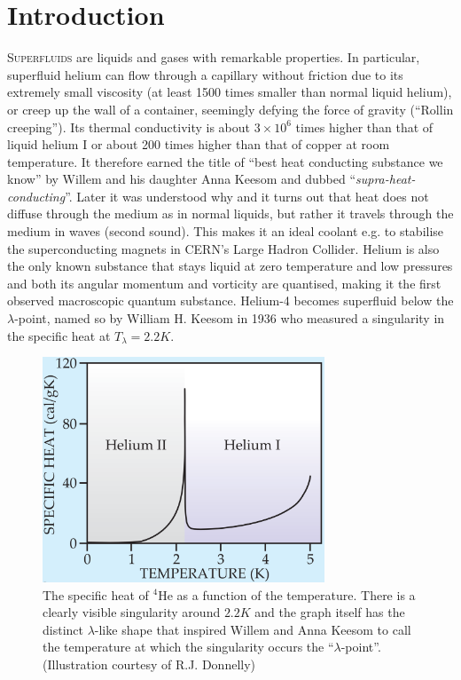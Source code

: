 \chapter{Introduction}
	\lettrine[lines=4]{\color{activeColor}S}{uperfluids} are liquids and gases with remarkable properties. In particular, superfluid helium can flow through a capillary without friction due to its extremely small viscosity (at least 1500 times smaller than normal liquid helium\citep{Kapitza1938}), or creep up the wall of a container, seemingly defying the force of gravity\citep{Rollin1939} (``Rollin creeping''). Its thermal conductivity is about $3\times10^6$ times higher than that of liquid helium I or about 200 times higher than that of copper at room temperature\citep{Keesom1936}. It therefore earned the title of ``best heat conducting substance we know'' by Willem and his daughter Anna Keesom and dubbed ``\emph{supra-heat-conducting}''\citep{Keesom1936}. Later it was understood why\citep{Tisza1938-1,Tisza1938-2,Tisza1940-1,Tisza1940-2} and it turns out that heat does not diffuse through the medium as in normal liquids, but rather it travels through the medium in waves (second sound). This makes it an ideal coolant e.g. to stabilise the superconducting magnets in CERN's Large Hadron Collider\citep{Lebrun1994}. Helium is also the only known substance that stays liquid at zero temperature and low pressures and both its angular momentum and vorticity are quantised, making it the first observed macroscopic quantum substance. Helium-4 becomes superfluid below the $\lambda$-point, named so by William H. Keesom in 1936 who measured a singularity in the specific heat at $T_\lambda=2.2\unit{K}$\citep{Keesom1936}.
	
	\begin{figure}[t]
		\begin{center}
			\includegraphics[width=0.75\textwidth]{specific-heat}
		\end{center}
		\caption{The specific heat of $^4$He as a function of the temperature. There is a clearly visible singularity around $2.2\unit{K}$ and the graph itself has the distinct $\lambda$-like shape that inspired\citep{Keesom1932} Willem and Anna Keesom to call the temperature at which the singularity occurs the ``$\lambda$-point''. (Illustration courtesy of R.J. Donnelly\citep{Donnelly2009})}
		\label{fig:specific-heat}
	\end{figure}	
	
